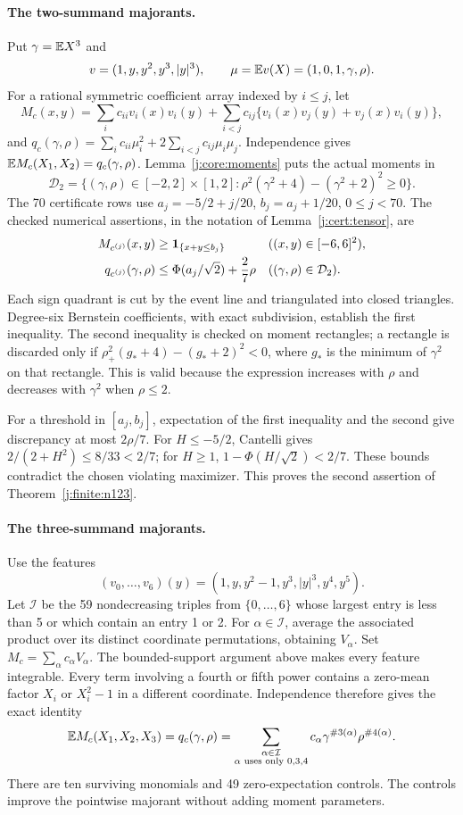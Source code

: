 \paragraph{The two-summand majorants.}
Put $\gamma=\mathbb E X^3$ and
\[
 v=(1,y,y^2,y^3,|y|^3),\qquad \mu=\mathbb E v(X)=(1,0,1,\gamma,\rho).
\]
For a rational symmetric coefficient array indexed by $i\le j$, let
\[
 M_c(x,y)=\sum_i c_{ii}v_i(x)v_i(y)+
 \sum_{i<j}c_{ij}\{v_i(x)v_j(y)+v_j(x)v_i(y)\},
\]
and $q_c(\gamma,\rho)=\sum_i c_{ii}\mu_i^2+
2\sum_{i<j}c_{ij}\mu_i\mu_j$.
Independence gives $\mathbb E M_c(X_1,X_2)=q_c(\gamma,\rho)$.
Lemma~\ref{j:core:moments} puts the actual moments in
\[
 \mathcal D_2=\{(\gamma,\rho)\in[-2,2]\times[1,2]:
 \rho^2(\gamma^2+4)-(\gamma^2+2)^2\ge0\}.
\]
The 70 certificate rows use
$a_j=-5/2+j/20$, $b_j=a_j+1/20$, $0\le j<70$.
The checked numerical assertions, in the notation of
Lemma~\ref{j:cert:tensor}, are
\begin{align*}
 M_{c^{(j)}}(x,y)&\ge\mathbf1_{\{x+y\le b_j\}}
                    &&((x,y)\in[-6,6]^2),\\
 q_{c^{(j)}}(\gamma,\rho)&\le\Phi(a_j/\sqrt2)+\frac27\rho
                    &&((\gamma,\rho)\in\mathcal D_2).
\end{align*}
Each sign quadrant is cut by the event line and triangulated into
closed triangles.  Degree-six Bernstein coefficients, with exact
subdivision, establish the first inequality.  The second inequality is
checked on moment rectangles; a rectangle is discarded only if
$\rho_+^2(g_*+4)-(g_*+2)^2<0$, where $g_*$ is the minimum of
$\gamma^2$ on that rectangle.  This is valid because the expression
increases with $\rho$ and decreases with $\gamma^2$ when $\rho\le2$.

For a threshold in $[a_j,b_j]$, expectation of the first inequality and
the second give discrepancy at most $2\rho/7$.
For $H\le-5/2$, Cantelli gives $2/(2+H^2)\le8/33<2/7$;
for $H\ge1$, $1-\Phi(H/\sqrt2)<2/7$.
These bounds contradict the chosen violating maximizer.  This proves
the second assertion of Theorem~\ref{j:finite:n123}.

\paragraph{The three-summand majorants.}
Use the features
\[
 (v_0,\ldots,v_6)(y)=(1,y,y^2-1,y^3,|y|^3,y^4,y^5).
\]
Let $\mathcal I$ be the 59 nondecreasing triples from $\{0,\ldots,6\}$
whose largest entry is less than 5 or which contain an entry 1 or 2.
For $\alpha\in\mathcal I$, average the associated product over its
distinct coordinate permutations, obtaining $V_\alpha$.
Set $M_c=\sum_\alpha c_\alpha V_\alpha$.
The bounded-support argument above makes every feature integrable.
Every term involving a fourth or fifth power contains a zero-mean
factor $X_i$ or $X_i^2-1$ in a different coordinate.  Independence
therefore gives the exact identity
\[
 \mathbb E M_c(X_1,X_2,X_3)=q_c(\gamma,\rho)
 =\sum_{\substack{\alpha\in\mathcal I\\\alpha\text{ uses only }0,3,4}}
     c_\alpha\gamma^{\#3(\alpha)}\rho^{\#4(\alpha)}.
\]
There are ten surviving monomials and 49 zero-expectation controls.
The controls improve the pointwise majorant without adding moment
parameters.

